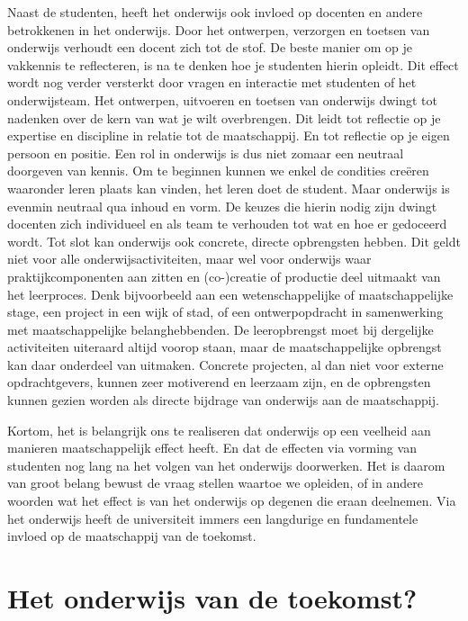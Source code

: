 \documentclass[smallauthor, chapterhaspagenum, nochapterinheader, pagenuminheader,  bigchapnum,medium2, tocpages, garamond, titleinheader]{jote-book}
\begin{document}
	Naast de studenten, heeft het onderwijs ook invloed op docenten en andere betrokkenen in het onderwijs. Door het ontwerpen, verzorgen en toetsen van onderwijs verhoudt een docent zich tot de stof. De beste manier om op je vakkennis te reflecteren, is na te denken hoe je studenten hierin opleidt. Dit effect wordt nog verder versterkt door vragen en interactie met studenten of het onderwijsteam. Het ontwerpen, uitvoeren en toetsen van onderwijs dwingt tot nadenken over de kern van wat je wilt overbrengen. Dit leidt tot reflectie op je expertise en discipline in relatie tot de maatschappij. En tot reflectie op je eigen persoon en positie. Een rol in onderwijs is dus niet zomaar een neutraal doorgeven van kennis. Om te beginnen kunnen we enkel de condities creëren waaronder leren plaats kan vinden, het leren doet de student. Maar onderwijs is evenmin neutraal qua inhoud en vorm. De keuzes die hierin nodig zijn dwingt docenten zich individueel en als team te verhouden tot wat en hoe er gedoceerd wordt. Tot slot kan onderwijs ook concrete, directe opbrengsten hebben. Dit geldt niet voor alle onderwijsactiviteiten, maar wel voor onderwijs waar praktijkcomponenten aan zitten en (co-)creatie of productie deel uitmaakt van het leerproces. Denk bijvoorbeeld aan een wetenschappelijke of maatschappelijke stage, een project in een wijk of stad, of een ontwerpopdracht in samenwerking met maatschappelijke belanghebbenden. De leeropbrengst moet bij dergelijke activiteiten uiteraard altijd voorop staan, maar de maatschappelijke opbrengst kan daar onderdeel van uitmaken. Concrete projecten, al dan niet voor externe opdrachtgevers, kunnen zeer motiverend en leerzaam zijn, en de opbrengsten kunnen gezien worden als directe bijdrage van onderwijs aan de maatschappij.



	Kortom, het is belangrijk ons te realiseren dat onderwijs op een veelheid aan manieren maatschappelijk effect heeft. En dat de effecten via vorming van studenten nog lang na het volgen van het onderwijs doorwerken. Het is daarom van groot belang bewust de vraag stellen waartoe we opleiden, of in andere woorden wat het effect is van het onderwijs op degenen die eraan deelnemen. Via het onderwijs heeft de universiteit immers een langdurige en fundamentele invloed op de maatschappij van de toekomst.



	\section{Het onderwijs van de toekomst?}
\end{document}

